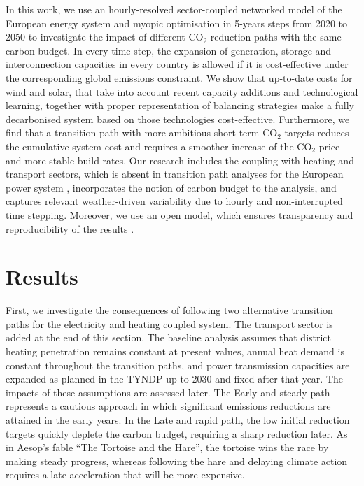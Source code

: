 \documentclass[5p]{elsarticle} %
\begin{document}
In this work, we use an hourly-resolved sector-coupled networked model of the European energy system and myopic optimisation in 5-years steps from 2020 to 2050 to investigate the impact of different CO$_2$ reduction paths with the same carbon budget. In every time step, the expansion of generation, storage and interconnection capacities in every country is allowed if it is cost-effective under the corresponding global emissions constraint. We show that up-to-date costs for wind and solar, that take into account recent capacity additions and technological learning, together with proper representation of balancing strategies make a fully decarbonised system based on those technologies cost-effective. Furthermore, we find that a transition path with more ambitious short-term CO$_2$ targets reduces the cumulative system cost and requires a smoother increase of the CO$_2$ price and more stable build rates. Our research includes the coupling  with heating and transport sectors, which is absent in transition path analyses for the European power system \cite{Plesmann_2017, Gerbaulet_2019, Poncelet_2016}, incorporates the notion of carbon budget to the analysis, and captures relevant weather-driven variability due to hourly and non-interrupted time stepping.  Moreover, we use an open model, which ensures transparency and reproducibility of the results \cite{Pfenninger_2017}. %

\section{Results}

First, we investigate the consequences of following two alternative transition paths for the electricity and heating coupled system. The transport sector is added at the end of this section. The baseline analysis assumes that district heating penetration remains constant at present values, annual heat demand is constant throughout the transition paths, and power transmission capacities are expanded as planned in the TYNDP \cite{TYNDP_scenarios} up to 2030 and fixed after that year. The impacts of these assumptions are assessed later. The Early and steady path represents a cautious approach in which significant emissions reductions are attained in the early years. In the Late and rapid path, the low initial reduction targets quickly deplete the carbon budget, requiring a sharp reduction later. As in Aesop's fable ``The Tortoise and the Hare'', the tortoise wins the race by making steady progress, whereas following the hare and delaying climate action requires a late acceleration that will be more expensive. 
\end{document}

